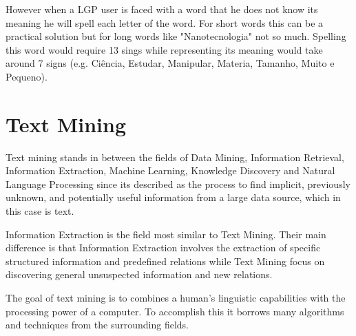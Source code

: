 However when a \gls{LGP} user is faced with a word that he does not know its meaning he will spell each letter of the word.
For short words this can be a practical solution but for long words like "Nanotecnologia" not so much.
Spelling this word would require 13 sings while representing its meaning would take around 7 signs (e.g. Ciência, Estudar, Manipular, Materia, Tamanho, Muito e Pequeno).

\section{Text Mining}

Text mining stands in between the fields of Data Mining, Information Retrieval, Information Extraction, Machine Learning, Knowledge Discovery and Natural Language Processing since its described as the process to find implicit, previously unknown, and potentially useful information from a large data source, which in this case is text.

Information Extraction is the field most similar to Text Mining.
Their main difference is that Information Extraction involves the extraction of specific structured information and predefined relations while Text Mining focus on discovering general unsuspected information and new relations\cite{mulins2008information}.

The goal of text mining is to combines a human's linguistic capabilities with the processing power of a computer\cite{fan2006tapping}.
To accomplish this it borrows many algorithms and techniques from the surrounding fields.

